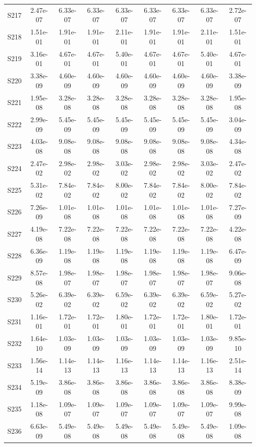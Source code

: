 {\begin{longtable}{l S[table-format=1.2e+2] S[table-format=1.2e+2] S[table-format=1.2e+2] S[table-format=1.2e+2] S[table-format=1.2e+2] S[table-format=1.2e+2] S[table-format=1.2e+2] S[table-format=1.2e+2]}
S217 & 2.47e-07 & 6.33e-07 & 6.33e-07 & 6.33e-07 & 6.33e-07 & 6.33e-07 & 6.33e-07 & 2.72e-07 \\
S218 & 1.51e-01 & 1.91e-01 & 1.91e-01 & 2.11e-01 & 1.91e-01 & 1.91e-01 & 2.11e-01 & 1.51e-01 \\
S219 & 3.16e-01 & 4.67e-01 & 4.67e-01 & 5.40e-01 & 4.67e-01 & 4.67e-01 & 5.40e-01 & 4.67e-01 \\
S220 & 3.38e-09 & 4.60e-09 & 4.60e-09 & 4.60e-09 & 4.60e-09 & 4.60e-09 & 4.60e-09 & 3.38e-09 \\
S221 & 1.95e-08 & 3.28e-08 & 3.28e-08 & 3.28e-08 & 3.28e-08 & 3.28e-08 & 3.28e-08 & 1.95e-08 \\
S222 & 2.99e-09 & 5.45e-09 & 5.45e-09 & 5.45e-09 & 5.45e-09 & 5.45e-09 & 5.45e-09 & 3.04e-09 \\
S223 & 4.03e-08 & 9.08e-08 & 9.08e-08 & 9.08e-08 & 9.08e-08 & 9.08e-08 & 9.08e-08 & 4.34e-08 \\
S224 & 2.47e-02 & 2.98e-02 & 2.98e-02 & 3.03e-02 & 2.98e-02 & 2.98e-02 & 3.03e-02 & 2.47e-02 \\
S225 & 5.31e-02 & 7.84e-02 & 7.84e-02 & 8.00e-02 & 7.84e-02 & 7.84e-02 & 8.00e-02 & 7.84e-02 \\
S226 & 7.26e-09 & 1.01e-08 & 1.01e-08 & 1.01e-08 & 1.01e-08 & 1.01e-08 & 1.01e-08 & 7.27e-09 \\
S227 & 4.19e-08 & 7.22e-08 & 7.22e-08 & 7.22e-08 & 7.22e-08 & 7.22e-08 & 7.22e-08 & 4.22e-08 \\
S228 & 6.36e-09 & 1.19e-08 & 1.19e-08 & 1.19e-08 & 1.19e-08 & 1.19e-08 & 1.19e-08 & 6.47e-09 \\
S229 & 8.57e-08 & 1.98e-07 & 1.98e-07 & 1.98e-07 & 1.98e-07 & 1.98e-07 & 1.98e-07 & 9.06e-08 \\
S230 & 5.26e-02 & 6.39e-02 & 6.39e-02 & 6.59e-02 & 6.39e-02 & 6.39e-02 & 6.59e-02 & 5.27e-02 \\
S231 & 1.16e-01 & 1.72e-01 & 1.72e-01 & 1.80e-01 & 1.72e-01 & 1.72e-01 & 1.80e-01 & 1.72e-01 \\
S232 & 1.64e-10 & 1.03e-09 & 1.03e-09 & 1.03e-09 & 1.03e-09 & 1.03e-09 & 1.03e-09 & 9.85e-10 \\
S233 & 1.56e-14 & 1.14e-13 & 1.14e-13 & 1.16e-13 & 1.14e-13 & 1.14e-13 & 1.16e-13 & 2.51e-14 \\
S234 & 5.19e-09 & 3.86e-08 & 3.86e-08 & 3.86e-08 & 3.86e-08 & 3.86e-08 & 3.86e-08 & 8.38e-09 \\
S235 & 1.18e-08 & 1.09e-07 & 1.09e-07 & 1.09e-07 & 1.09e-07 & 1.09e-07 & 1.09e-07 & 9.99e-08 \\
S236 & 6.63e-09 & 5.49e-08 & 5.49e-08 & 5.49e-08 & 5.49e-08 & 5.49e-08 & 5.49e-08 & 1.09e-08 \\

\end{longtable}}
